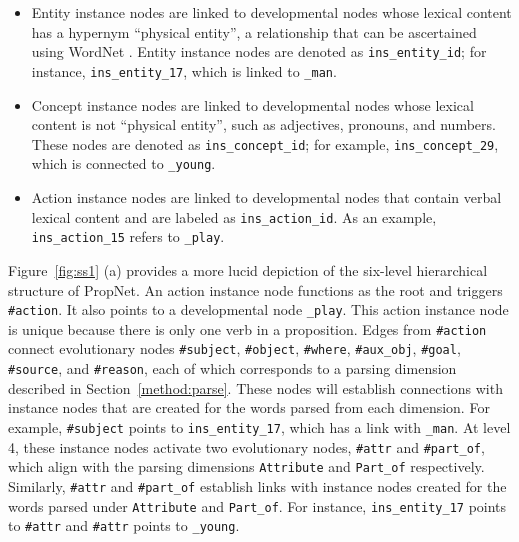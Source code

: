 \begin{itemize}
    \item Entity instance nodes are linked to developmental nodes whose lexical content has a hypernym ``physical entity'', a relationship that can be ascertained using WordNet \citep{miller1995wordnet}. Entity instance nodes are denoted as \texttt{ins\_entity\_id}; for instance, \texttt{ins\_entity\_17}, which is linked to \texttt{\_man}.
    \item Concept instance nodes are linked to developmental nodes whose lexical content is not ``physical entity'', such as adjectives, pronouns, and numbers. These nodes are denoted as \texttt{ins\_concept\_id}; for example, \texttt{ins\_concept\_29}, which is connected to \texttt{\_young}.
    \item Action instance nodes are linked to developmental nodes that contain verbal lexical content and are labeled as \texttt{ins\_action\_id}. As an example, \texttt{ins\_action\_15} refers to \texttt{\_play}.
\end{itemize}


Figure~\ref{fig:ss1} (a) provides a more lucid depiction of the six-level hierarchical structure of PropNet. An action instance node functions as the root and triggers \texttt{\#action}. It also points to a developmental node \texttt{\_play}. This action instance node is unique because there is only one verb in a proposition. Edges from \texttt{\#action} connect evolutionary nodes \texttt{\#subject}, \texttt{\#object}, \texttt{\#where}, \texttt{\#aux\_obj}, \texttt{\#goal}, \texttt{\#source}, and \texttt{\#reason}, each of which corresponds to a parsing dimension described in Section~\ref{method:parse}. These nodes will establish connections with instance nodes that are created for the words parsed from each dimension. For example, \texttt{\#subject} points to \texttt{ins\_entity\_17}, which has a link with \texttt{\_man}. At level 4, these instance nodes activate two evolutionary nodes, \texttt{\#attr} and \texttt{\#part\_of}, which align with the parsing dimensions \texttt{Attribute} and \texttt{Part\_of} respectively. Similarly, \texttt{\#attr} and \texttt{\#part\_of} establish links with instance nodes created for the words parsed under \texttt{Attribute} and \texttt{Part\_of}. For instance, \texttt{ins\_entity\_17} points to \texttt{\#attr} and \texttt{\#attr} points to \texttt{\_young}.


